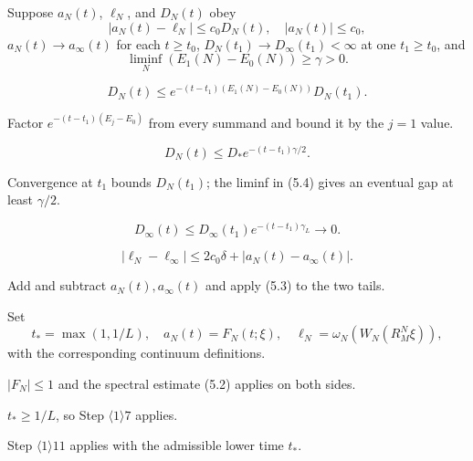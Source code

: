 \documentclass[11pt,a4paper]{article}
\begin{document}

Suppose $a_N(t)$, $\ell_N$, and $D_N(t)$ obey
\[
 |a_N(t)-\ell_N|\le c_0D_N(t),\quad |a_N(t)|\le c_0,
\tag{5.3}
\]
$a_N(t)\to a_\infty(t)$ for each $t\ge t_0$,
$D_N(t_1)\to D_\infty(t_1)<\infty$ at one $t_1\ge t_0$, and
\[
 \liminf_N(E_1(N)-E_0(N))\ge\gamma>0.
\tag{5.4}
\]

\[
 D_N(t)\le e^{-(t-t_1)(E_1(N)-E_0(N))}D_N(t_1).
\tag{5.5}
\]

\Because Factor $e^{-(t-t_1)(E_j-E_0)}$ from every summand and bound it by
the $j=1$ value.

\[
 D_N(t)\le D_*e^{-(t-t_1)\gamma/2}.
\tag{5.6}
\]

\Because Convergence at $t_1$ bounds $D_N(t_1)$; the liminf in (5.4) gives an
eventual gap at least $\gamma/2$.

\[
 D_\infty(t)\le
 D_\infty(t_1)e^{-(t-t_1)\gamma_L}\to0.
\tag{5.7}
\]

\[
 |\ell_N-\ell_\infty|
 \le2c_0\delta+|a_N(t)-a_\infty(t)|.
\tag{5.8}
\]

\Because Add and subtract $a_N(t),a_\infty(t)$ and apply (5.3) to the two tails.


\QedStep


Set
\[
 t_*=\max(1,1/L),\quad
 a_N(t)=F_N(t;\xi),\quad
 \ell_N=\omega_N(W_N(R_M^N\xi)),
\tag{5.9}
\]
with the corresponding continuum definitions.


\Because $|F_N|\le1$ and the spectral estimate (5.2) applies on both sides.


\Because $t_*\ge1/L$, so Step $\langle1\rangle7$ applies.


\Because Step $\langle1\rangle11$ applies with the admissible lower time $t_*$.
\end{document}
